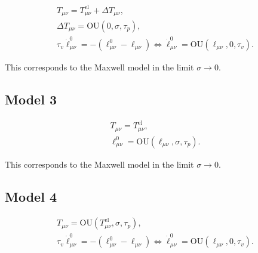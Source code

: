 \documentclass{revtex-custom}
\begin{document}
\begin{subequations}
\begin{align}
T_{\mu\nu} = T_{\mu\nu}^{\mathrm{el}} + \Delta T_{\mu\nu},\\
\Delta T_{\mu\nu} = \mathrm{OU}(0, \sigma, \tau_p),\\
\tau_v \dot{\ell}^0_{\mu\nu} = -(\ell^0_{\mu\nu} - \ell_{\mu\nu}) \Leftrightarrow \dot{\ell}^0_{\mu\nu} = \mathrm{OU}(\ell_{\mu\nu}, 0, \tau_v).
\end{align}
\end{subequations}

This corresponds to the Maxwell model in the limit $\sigma \to 0$.

\subsection{Model 3}

\begin{subequations}
\begin{align}
T_{\mu\nu} = T_{\mu\nu}^{\mathrm{el}},\\
\ell^0_{\mu\nu} = \mathrm{OU}(\ell_{\mu\nu}, \sigma, \tau_p).
\end{align}
\end{subequations}

This corresponds to the Maxwell model in the limit $\sigma \to 0$.

\subsection{Model 4}

\begin{subequations}
\begin{align}
T_{\mu\nu} = \mathrm{OU}(T_{\mu\nu}^{\mathrm{el}}, \sigma, \tau_p),\\
\tau_v \dot{\ell}^0_{\mu\nu} = -(\ell^0_{\mu\nu} - \ell_{\mu\nu}) \Leftrightarrow \dot{\ell}^0_{\mu\nu} = \mathrm{OU}(\ell_{\mu\nu}, 0, \tau_v).
\end{align}
\end{subequations}
\end{document}
